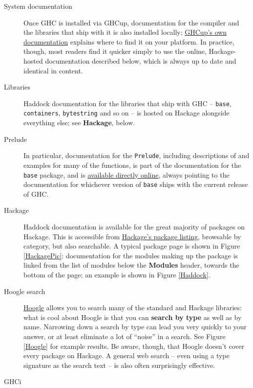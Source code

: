 \begin{description}
\item[System documentation]
Once GHC is installed via GHCup, documentation for the compiler and the libraries that ship with it is also installed locally; \href{https://www.haskell.org/ghcup/}{GHCup's own documentation} explains where to find it on your platform. In practice, though, most readers find it quicker simply to use the online, Hackage-hosted documentation described below, which is always up to date and identical in content.
\item[Libraries]
Haddock documentation for the libraries that ship with GHC -- \texttt{base}, \texttt{containers}, \texttt{bytestring} and so on -- is hosted on Hackage alongside everything else; see \textbf{Hackage}, below.
\item[Prelude]
In particular, documentation for the \texttt{Prelude}, including descriptions of and examples for many of the functions, is part of the documentation for the \texttt{base} package, and is \href{https://hackage.haskell.org/package/base/docs/Prelude.html}{available directly online}, always pointing to the documentation for whichever version of \texttt{base} ships with the current release of GHC.
\item[Hackage]
Haddock documentation is available for the great majority of packages on Hackage. This is accessible from \href{https://hackage.haskell.org/package/}{Hackage's package listing}, browsable by category, but also searchable. A typical package page is shown in Figure \ref{HackagePic}: documentation for the modules making up the package is linked from the list of modules below the \textbf{Modules} header, towards the bottom of the page; an example is shown in Figure \ref{Haddock}.
\item[Hoogle search]\label{hoogle}
\href{https://hoogle.haskell.org/}{Hoogle} allows you to search many of the standard and Hackage libraries: what is cool about Hoogle is that you can \textbf{search by type} as well as by name. Narrowing down a search by type can lead you very quickly to your answer, or at least eliminate a lot of ``noise'' in a search.
See Figure \ref{Hoogle} for example results. Be aware, though, that Hoogle doesn't cover every package on Hackage. A general web search -- even using a type signature as the search text -- is also often surprisingly effective.
\item[GHCi]

\end{description}
